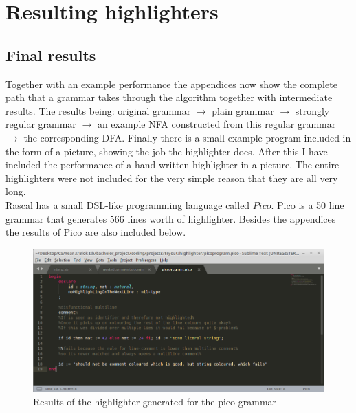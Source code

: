 \section{Resulting highlighters}
\subsection{Final results}
Together with an example performance the appendices now show the complete path that a grammar takes through the algorithm together with intermediate results. The results being: original grammar $\rightarrow$ plain grammar $\rightarrow$ strongly regular grammar $\rightarrow$ an example NFA constructed from this regular grammar $\rightarrow$ the corresponding DFA. Finally there is a small example program included in the form of a picture, showing the job the highlighter does. After this I have included the performance of a hand-written highlighter in a picture. The entire highlighters were not included for the very simple reason that they are all very long.\\

\noindent Rascal has a small DSL-like programming language called $Pico$. Pico is a 50 line grammar that generates 566 lines worth of highlighter. Besides the appendices the results of Pico are also included below. 
\begin{figure}[h!]
	\centering
	\includegraphics[width=\textwidth, keepaspectratio]{Figures/highlightShots/pico_generated.png}
	\decoRule
 	\caption[Generated highlighter results for Pico grammar]{Results of the highlighter generated for the pico grammar}
\end{figure}

